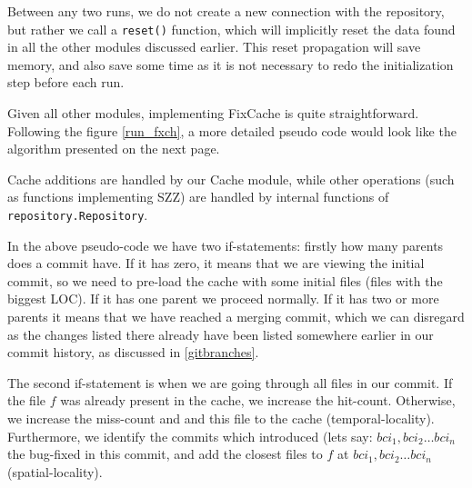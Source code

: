 \documentclass[12pt,twoside,notitlepage]{report}
\newcommand{\fxch}{FixCache}
\begin{document}
Between any two runs, we do not create a new connection with the repository, but rather we call a \texttt{reset()} function, which will implicitly reset the data found in all the other modules discussed earlier. This reset propagation will save memory, and also save some time as it is not necessary to redo the initialization step before each run.

Given all other modules, implementing \fxch{} is quite straightforward. Following the figure \ref{run_fxch}, a more detailed pseudo code would look like the algorithm presented on the next page.
\clearpage
\begin{algorithm}[H]
\caption{Pseudo-code for \fxch{}.}
\label{fxch_psd}
\end{algorithm}
\vspace{1em}
Cache additions are handled by our Cache module, while other operations (such as functions implementing SZZ) are handled by internal functions of \texttt{repository.Repository}.

In the above pseudo-code we have two if-statements: firstly how many parents does a commit have. If it has zero, it means that we are viewing the initial commit, so we need to pre-load the cache with some initial files (files with the biggest LOC). If it has one parent we proceed normally. If it has two or more parents it means that we have reached a merging commit, which we can disregard as the changes listed there already have been listed somewhere earlier in our commit history, as discussed in \ref{gitbranches}.

The second if-statement is when we are going through all files in our commit. If the file $f$ was already present in the cache, we increase the hit-count. Otherwise, we increase the miss-count and and this file to the cache (temporal-locality). Furthermore, we identify the commits which introduced (lets say: $bci_1, bci_2 \dots bci_n$ the bug-fixed in this commit, and add the closest files to $f$ at $bci_1, bci_2 \dots bci_n$ (spatial-locality).
\end{document}
